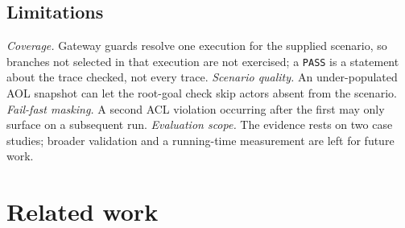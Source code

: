 \documentclass[a4paper, conference]{IEEEtran}
\begin{document}
\subsection{Limitations}
\emph{Coverage.} Gateway guards resolve one execution for the supplied scenario, so branches not selected in that execution are not exercised; a \texttt{PASS} is a statement about the trace checked, not every trace. \emph{Scenario quality.} An under-populated AOL snapshot can let the root-goal check skip actors absent from the scenario. \emph{Fail-fast masking.} A second ACL violation occurring after the first may only surface on a subsequent run. \emph{Evaluation scope.} The evidence rests on two case studies; broader validation and a running-time measurement are left for future work.

\section{Related work}
\label{sect:relatedWork}



\end{document}
